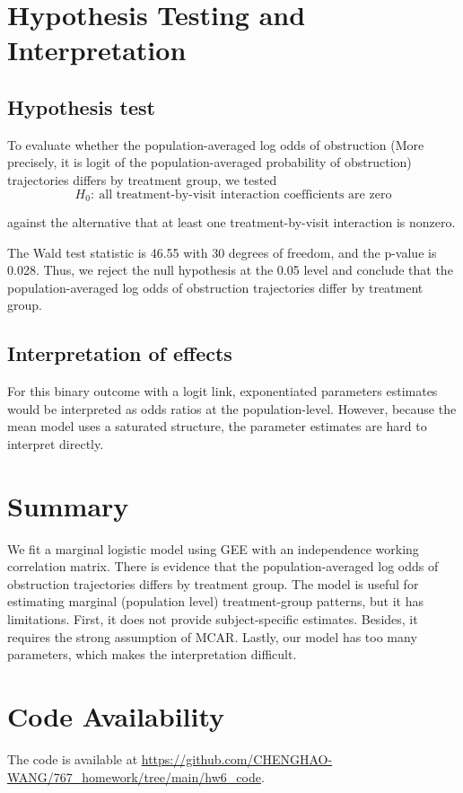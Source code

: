 \documentclass[12pt]{article}
\begin{document}
\section{Hypothesis Testing and Interpretation}

\subsection{Hypothesis test}

To evaluate whether the population-averaged log odds of obstruction 
(More precisely, it is logit of the population-averaged probability of obstruction)
trajectories differs by
treatment group, we tested
\[
H_0:\ \text{all treatment-by-visit interaction coefficients are zero}
\]

against the alternative that at least one treatment-by-visit interaction is
nonzero. 

The Wald test statistic is 46.55 with 30 degrees of freedom, and the p-value is
0.028. Thus, we reject the null hypothesis at the 0.05 level and conclude that
the population-averaged log odds of obstruction trajectories differ by treatment group.


\subsection{Interpretation of effects}

For this binary outcome with a logit link, exponentiated parameters estimates 
would be
interpreted as odds ratios at the population-level. 
However, because the mean model
uses a saturated structure, the parameter estimates are hard to interpret directly.

\section{Summary}

We fit a marginal logistic model using GEE 
with an independence working correlation matrix.
There is evidence that the population-averaged log odds of obstruction trajectories
differs by
treatment group. The model is useful for estimating marginal (population level) treatment-group
patterns, but it has limitations. 
First, it does not provide subject-specific estimates.
Besides, it requires the strong assumption of MCAR.
Lastly, our model has too many parameters, which makes the
interpretation difficult.

\section{Code Availability}

The code is available at
\url{https://github.com/CHENGHAO-WANG/767_homework/tree/main/hw6_code}.
\end{document}
